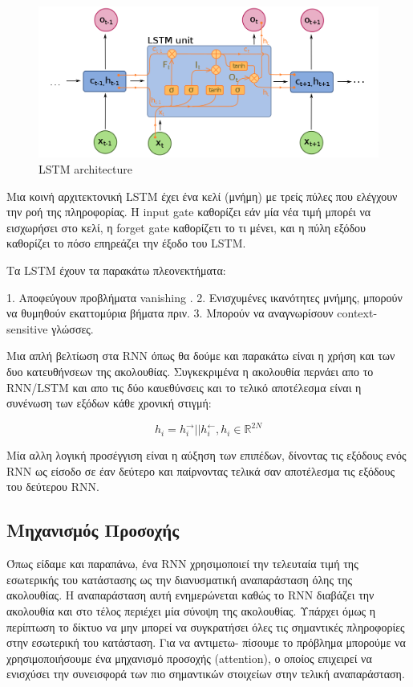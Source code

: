 \documentclass[12pt]{article}
\begin{document}
\begin{figure}[h!]
	\centering
	\includegraphics[width=0.6\linewidth]{./img/lstm.png}
	\caption{LSTM architecture}
	\label{fig:sin}
\end{figure}



Μια κοινή αρχιτεκτονική LSTM έχει ένα κελί (μνήμη) με τρείς πύλες που ελέγχουν την ροή της πληροφορίας. Η input gate καθορίζει  εάν μία νέα τιμή μπορέι να εισχωρήσει στο κελί, η  forget gate καθορίζετι το τι μένει, και η πύλη εξόδου καθορίζει το πόσο επηρεάζει την έξοδο του LSTM. 

Τα LSTM έχουν τα παρακάτω πλεονεκτήματα:

1. Αποφεύγουν προβλήματα vanishing  .
2. Ενισχυμένες ικανότητες μνήμης, μπορούν να θυμηθούν εκαττομύρια βήματα πριν.
3. Μπορούν να αναγνωρίσουν context-sensitive γλώσσες.

Μια απλή βελτίωση στα RNN όπως θα δούμε και παρακάτω είναι η χρήση και των δυο κατευθήνσεων της ακολουθίας. Συγκεκριμένα η ακολουθία περνάει απο το RNN/LSTM και απο τις δύο καυεθύνσεις και το τελικό αποτέλεσμα είναι η συνένωση των εξόδων κάθε χρονική στιγμή:

$$h_i = h_i^{\rightarrow} || h_i^{\leftarrow}, h_i \in \mathbb{R}^{2N}$$

Μία αλλη λογική προσέγγιση είναι η αύξηση των επιπέδων, δίνοντας τις εξόδους ενός RNN ως είσοδο σε έαν δεύτερο και παίρνοντας τελικά σαν αποτέλεσμα τις εξόδους του δεύτερου RNN.


\subsection*{Μηχανισμός Προσοχής}

Όπως είδαμε και παραπάνω, ένα RNN χρησιμοποιεί την τελευταία τιμή της εσωτερικής του κατάστασης ως την διανυσματική αναπαράσταση όλης της ακολουθίας. Η αναπαράσταση αυτή ενημερώνεται καθώς το RNN διαβάζει την ακολουθία και στο τέλος περιέχει μία σύνοψη της ακολουθίας. Υπάρχει όμως η περίπτωση το δίκτυο να μην μπορεί να συγκρατήσει όλες τις σημαντικές πληροφορίες στην εσωτερική του κατάσταση. Για να αντιμετω-
πίσουμε το πρόβλημα  μπορούμε να χρησιμοποιήσουμε ένα μηχανισμό προσοχής (attention), ο οποίος επιχειρεί να ενισχύσει την συνεισφορά των
πιο σημαντικών στοιχείων στην τελική αναπαράσταση.
\end{document}
